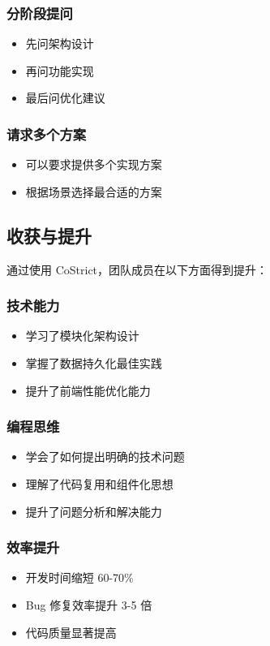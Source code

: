 ﻿\documentclass[12pt,a4paper]{article}
\begin{document}
\subsubsection{分阶段提问}
\begin{itemize}
    \item 先问架构设计
    \item 再问功能实现
    \item 最后问优化建议
\end{itemize}

\subsubsection{请求多个方案}
\begin{itemize}
    \item 可以要求提供多个实现方案
    \item 根据场景选择最合适的方案
\end{itemize}

\subsection{收获与提升}

通过使用 CoStrict，团队成员在以下方面得到提升：

\subsubsection{技术能力}
\begin{itemize}
    \item 学习了模块化架构设计
    \item 掌握了数据持久化最佳实践
    \item 提升了前端性能优化能力
\end{itemize}

\subsubsection{编程思维}
\begin{itemize}
    \item 学会了如何提出明确的技术问题
    \item 理解了代码复用和组件化思想
    \item 提升了问题分析和解决能力
\end{itemize}

\subsubsection{效率提升}
\begin{itemize}
    \item 开发时间缩短 60-70\%
    \item Bug 修复效率提升 3-5 倍
    \item 代码质量显著提高
\end{itemize}
\end{document}
